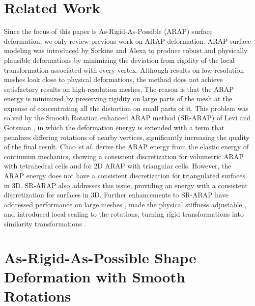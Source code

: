 \documentclass{birkjour}
\theoremstyle{remark}
\numberwithin{equation}{section}
\begin{document}
\section{Related Work}

Since the focus of this paper is As-Rigid-As-Possible (ARAP) surface deformation, we only review previous work on ARAP deformation. ARAP surface modeling was introduced by Sorkine and Alexa \cite{Sorkine2007} to produce robust and physically plausible deformations by minimizing the deviation from rigidity of the local transformation associated with every vertex. Although results on low-resolution meshes look close to physical deformations, the method does not achieve satisfactory results on high-resolution meshes. The reason is that the ARAP energy is minimized by preserving rigidity on large parts of the mesh at the expense of concentrating all the distortion on small parts of it. This problem was solved by the Smooth Rotation enhanced ARAP method (SR-ARAP) of Levi and Gotsman \cite{Levi2015}, in which the deformation energy is extended with a term that penalizes differing rotations of nearby vertices, significantly increasing the quality of the final result. Chao \emph{et al.} \cite{Chao2010} derive the ARAP energy from the elastic energy of continuum mechanics, showing a consistent discretization for volumetric ARAP with tetrahedral cells and for 2D ARAP with triangular cells. However, the ARAP energy does not have a consistent discretization for triangulated surfaces in 3D. SR-ARAP \cite{Levi2015} also addresses this issue, providing an energy with a consistent discretization for surfaces in 3D. Further enhancements to SR-ARAP have addressed performance on large meshes \cite{Morsucci2018, Ligare2020}, made the physical stiffness adjustable \cite{Chen2017, LeVaou2020}, and introduced local scaling to the rotations, turning rigid transformations into similarity transformations \cite{Jiang2017}.



\section{As-Rigid-As-Possible Shape Deformation with Smooth Rotations}
\label{section:sr_arap}
\end{document}
